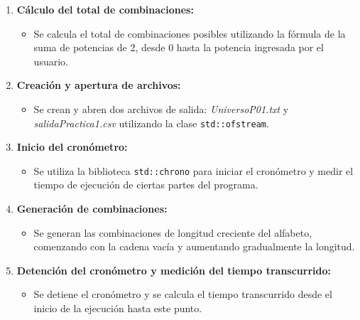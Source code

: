 \documentclass{article}
\begin{document}
                    \begin{enumerate}
                        \item \textbf{Cálculo del total de combinaciones:}
                        \begin{itemize}
                            \item Se calcula el total de combinaciones posibles utilizando la fórmula de la suma de potencias de 2, desde 0
                            hasta la potencia ingresada por el usuario.
                        \end{itemize}

                        \item \textbf{Creación y apertura de archivos:}
                        \begin{itemize}
                            \item Se crean y abren dos archivos de salida: \textit{UniversoP01.txt} y \textit{salidaPractica1.csv} utilizando la clase \texttt{std::ofstream}.
                        \end{itemize}

                        \item \textbf{Inicio del cronómetro:}
                        \begin{itemize}
                            \item Se utiliza la biblioteca \texttt{std::chrono} para iniciar el cronómetro y medir el tiempo de ejecución
                            de ciertas partes del programa.
                        \end{itemize}

                        \item \textbf{Generación de combinaciones:}
                        \begin{itemize}
                            \item Se generan las combinaciones de longitud creciente del alfabeto, comenzando con la cadena vacía y
                            aumentando gradualmente la longitud.
                        \end{itemize}

                        \item \textbf{Detención del cronómetro y medición del tiempo transcurrido:}
                        \begin{itemize}
                            \item Se detiene el cronómetro y se calcula el tiempo transcurrido desde el inicio de la ejecución hasta este
                            punto.
                        \end{itemize}


\end{enumerate}
\end{document}
